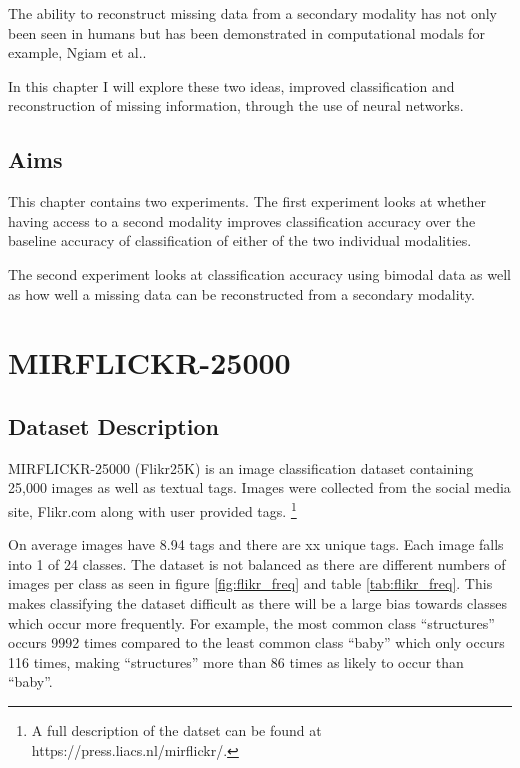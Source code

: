 The ability to reconstruct missing data from a secondary modality has not only been seen in humans \cite{ma2009lip, samuel1997lexical} but has been demonstrated in computational modals for example, Ngiam et al.\cite{ngiam2011multimodal}.

In this chapter I will explore these two ideas, improved classification and reconstruction of missing information, through the use of neural networks.

\subsection{Aims}
This chapter contains two experiments. The first experiment looks at whether having access to a second modality improves classification accuracy over the baseline accuracy of classification of either of the two individual modalities.

The second experiment looks at classification accuracy using bimodal data as well as how well a missing data can be reconstructed from a secondary modality.

\section{MIRFLICKR-25000}
\label{sec:flikr}
\subsection{Dataset Description}
MIRFLICKR-25000 (Flikr25K) is an image classification dataset containing 25,000 images as well as textual tags. Images were collected from the social media site, Flikr.com along with user provided tags. \footnote{A full description of the datset can be found at https://press.liacs.nl/mirflickr/.}

On average images have 8.94 tags and there are xx unique tags. Each image falls into 1 of 24 classes. 
The dataset is not balanced as there are different numbers of images per class as seen in figure \ref{fig:flikr_freq} and table \ref{tab:flikr_freq}. This makes classifying the dataset difficult as there will be a large bias towards classes which occur more frequently. For example, the most common class ``structures'' occurs 9992 times compared to the least common class ``baby'' which only occurs 116 times, making ``structures'' more than 86 times as likely to occur than ``baby''.

